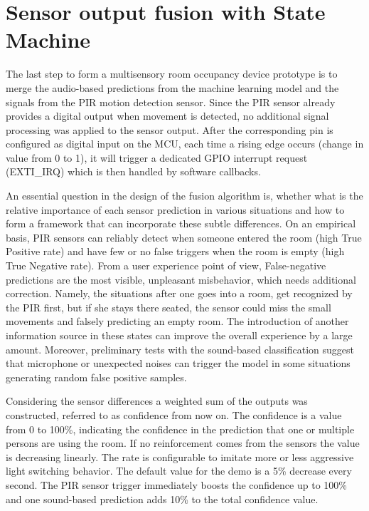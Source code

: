 \section{Sensor output fusion with State Machine}

The last step to form a multisensory room occupancy device prototype is to merge the audio-based predictions from the machine learning model and the signals from the PIR motion detection sensor. Since the PIR sensor already provides a digital output when movement is detected, no additional signal processing was applied to the sensor output. After the corresponding pin is configured as digital input on the MCU, each time a rising edge occurs (change in value from 0 to 1), it will trigger a dedicated GPIO interrupt request (EXTI\_IRQ) which is then handled by software callbacks.

An essential question in the design of the fusion algorithm is, whether what is the relative importance of each sensor prediction in various situations and how to form a framework that can incorporate these subtle differences. On an empirical basis, PIR sensors can reliably detect when someone entered the room (high True Positive rate) and have few or no false triggers when the room is empty (high True Negative rate). From a user experience point of view, False-negative predictions are the most visible, unpleasant misbehavior, which needs additional correction. Namely, the situations after one goes into a room, get recognized by the PIR first, but if she stays there seated, the sensor could miss the small movements and falsely predicting an empty room. The introduction of another information source in these states can improve the overall experience by a large amount.
Moreover, preliminary tests with the sound-based classification suggest that microphone or unexpected noises can trigger the model in some situations generating random false positive samples.

Considering the sensor differences a weighted sum of the outputs was constructed, referred to as confidence from now on. The confidence is a value from 0 to 100\%, indicating the confidence in the prediction that one or multiple persons are using the room. If no reinforcement comes from the sensors the value is decreasing linearly. The rate is configurable to imitate more or less aggressive light switching behavior. The default value for the demo is a 5\% decrease every second. The PIR sensor trigger immediately boosts the confidence up to 100\% and one sound-based prediction adds 10\% to the total confidence value.

